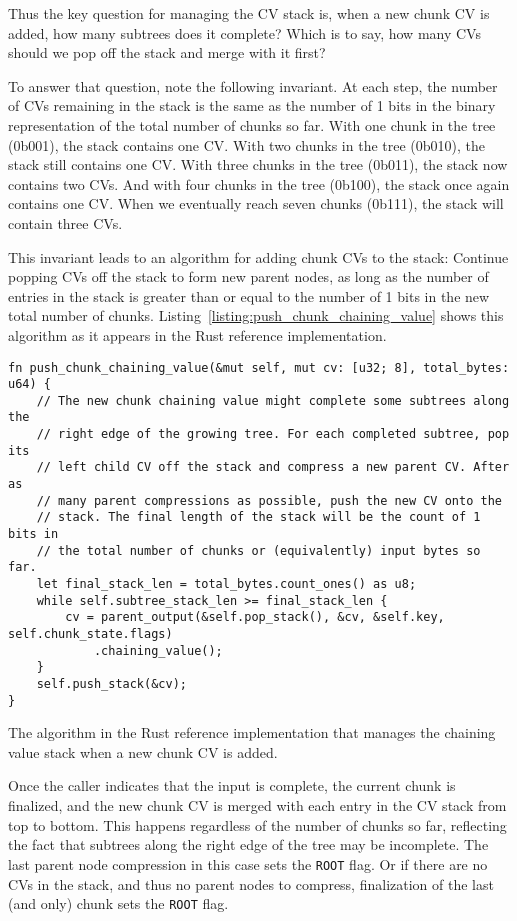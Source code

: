 \documentclass[11pt,notitlepage,a4paper]{article}
\begin{document}
Thus the key question for managing the CV stack is, when a new chunk CV is
added, how many subtrees does it complete? Which is to say, how many CVs should
we pop off the stack and merge with it first?

To answer that question, note the following invariant. At each step, the number
of CVs remaining in the stack is the same as the number of 1 bits in the binary
representation of the total number of chunks so far. With one chunk in the tree
(0b001), the stack contains one CV. With two chunks in the tree (0b010), the
stack still contains one CV. With three chunks in the tree (0b011), the stack
now contains two CVs. And with four chunks in the tree (0b100), the stack once
again contains one CV. When we eventually reach seven chunks (0b111), the stack
will contain three CVs.

This invariant leads to an algorithm for adding chunk CVs to the stack:
Continue popping CVs off the stack to form new parent nodes, as long as the
number of entries in the stack is greater than or equal to the number of 1 bits
in the new total number of chunks.
Listing~\ref{listing:push_chunk_chaining_value} shows this algorithm as it
appears in the Rust reference implementation.

\begin{listing}[h]
\begin{verbatim}
fn push_chunk_chaining_value(&mut self, mut cv: [u32; 8], total_bytes: u64) {
    // The new chunk chaining value might complete some subtrees along the
    // right edge of the growing tree. For each completed subtree, pop its
    // left child CV off the stack and compress a new parent CV. After as
    // many parent compressions as possible, push the new CV onto the
    // stack. The final length of the stack will be the count of 1 bits in
    // the total number of chunks or (equivalently) input bytes so far.
    let final_stack_len = total_bytes.count_ones() as u8;
    while self.subtree_stack_len >= final_stack_len {
        cv = parent_output(&self.pop_stack(), &cv, &self.key, self.chunk_state.flags)
            .chaining_value();
    }
    self.push_stack(&cv);
}
\end{verbatim}
\caption{The algorithm in the Rust reference implementation that manages the
    chaining value stack when a new chunk CV is added.}
\label{listing:push_chunk_chaining_value}
\end{listing}

Once the caller indicates that the input is complete, the current chunk is
finalized, and the new chunk CV is merged with each entry in the CV stack from
top to bottom. This happens regardless of the number of chunks so far,
reflecting the fact that subtrees along the right edge of the tree may be
incomplete. The last parent node compression in this case sets the
\texttt{ROOT} flag. Or if there are no CVs in the stack, and thus no parent
nodes to compress, finalization of the last (and only) chunk sets the
\texttt{ROOT} flag.
\end{document}
